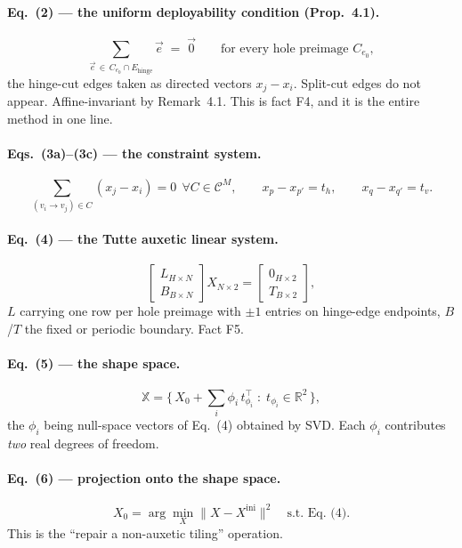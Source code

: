 \documentclass[10pt,a4paper]{article}
\begin{document}
\paragraph{Eq.~(2) --- the uniform deployability condition (Prop.~4.1).}
\[
\sum_{\vec e \,\in\, C_{e_0} \cap E_{\mathrm{hinge}}} \vec e \;=\; \vec 0
\qquad\text{for every hole preimage } C_{e_0},
\]
the hinge-cut edges taken as directed vectors $x_j - x_i$. Split-cut edges do not appear.
Affine-invariant by Remark~4.1. This is fact F4, and it is the entire method in one line.

\paragraph{Eqs.~(3a)--(3c) --- the constraint system.}
\[
\sum_{(v_i\to v_j)\in C}(x_j - x_i) = 0 \ \ \forall C\in\mathcal C^M,\qquad
x_p - x_{p'} = t_h,\qquad x_q - x_{q'} = t_v .
\]

\paragraph{Eq.~(4) --- the Tutte auxetic linear system.}
\[
\begin{bmatrix} L_{H\times N} \\ B_{B\times N}\end{bmatrix} X_{N\times 2}
= \begin{bmatrix} 0_{H\times 2}\\ T_{B\times 2}\end{bmatrix},
\]
$L$ carrying one row per hole preimage with $\pm 1$ entries on hinge-edge endpoints, $B$/$T$ the
fixed or periodic boundary. Fact F5.

\paragraph{Eq.~(5) --- the shape space.}
\[
\mathbb X = \Big\{\, X_0 + \textstyle\sum_i \phi_i\, t_{\phi_i}^{\!\top} \;:\; t_{\phi_i}\in\mathbb R^2 \,\Big\},
\]
the $\phi_i$ being null-space vectors of Eq.~(4) obtained by SVD. Each $\phi_i$ contributes
\emph{two} real degrees of freedom.

\paragraph{Eq.~(6) --- projection onto the shape space.}
\[
X_0 = \arg\min_X \|X - X^{\mathrm{ini}}\|^2 \quad \text{s.t.\ Eq.~(4)} .
\]
This is the ``repair a non-auxetic tiling'' operation.
\end{document}
